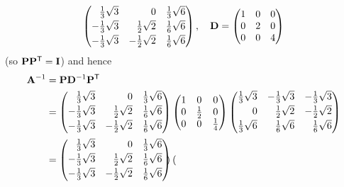 \documentclass[fleqn,a4paper,11pt]{article}
\begin{document}
\begin{enumerate}[label=\textbf{\arabic*.}]
\begin{equation*}
\begin{pmatrix*}[r]
     \frac 13 \sqrt 3  & 0                 & \frac 13 \sqrt 6 \\[0.5ex]
     -\frac 13 \sqrt 3 & \frac 12 \sqrt 2  & \frac 16 \sqrt 6 \\[0.5ex]
     -\frac 13 \sqrt 3 & -\frac 12 \sqrt 2 & \frac 16 \sqrt 6
    \end{pmatrix*}, \quad
    \mat D =
    \begin{pmatrix}
     1 & 0 & 0 \\
     0 & 2 & 0 \\
     0 & 0 & 4
    \end{pmatrix}
   \end{equation*}
   (so \(\mathbf{P} \mathbf{P}^{\mathsf T} = \mathbf{I}\)) and hence
   \begin{align*}
    \mat A^{-1}
    &= \mat P \mat D^{-1} \tran{\mat P} \\
    &=
    \begin{pmatrix*}[r]
     \frac 13 \sqrt 3  & 0                 & \frac 13 \sqrt 6 \\[0.5ex]
     -\frac 13 \sqrt 3 & \frac 12 \sqrt 2  & \frac 16 \sqrt 6 \\[0.5ex]
     -\frac 13 \sqrt 3 & -\frac 12 \sqrt 2 & \frac 16 \sqrt 6 \\[0.5ex]
    \end{pmatrix*}
    \begin{pmatrix}
     1 & 0 & 0 \\
     0 & \frac 12 & 0 \\
     0 & 0 & \frac 14
    \end{pmatrix}
    \begin{pmatrix*}[r]
     \frac 13 \sqrt 3  & -\frac 13 \sqrt 3 & -\frac 13 \sqrt 3 \\[0.5ex]
     0 & \frac 12 \sqrt 2 & -\frac 12 \sqrt 2 \\[0.5ex]
     \frac 13 \sqrt 6 & \frac 16 \sqrt 6 & \frac 16 \sqrt 6 \\[0.5ex]
    \end{pmatrix*} \\
    &=
    \begin{pmatrix*}[r]
     \frac 13 \sqrt 3  & 0                 & \frac 13 \sqrt 6 \\[0.5ex]
     -\frac 13 \sqrt 3 & \frac 12 \sqrt 2  & \frac 16 \sqrt 6 \\[0.5ex]
     -\frac 13 \sqrt 3 & -\frac 12 \sqrt 2 & \frac 16 \sqrt 6 \\[0.5ex]
    \end{pmatrix*}
    \begin{pmatrix*}[r]

\end{pmatrix*}
\end{align*}
\end{enumerate}
\end{document}
